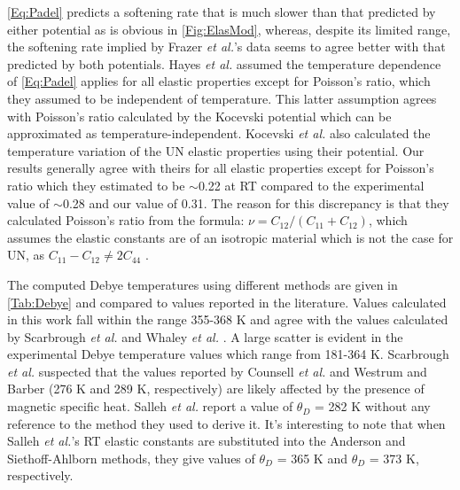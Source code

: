 \documentclass[preprint, 12pt]{elsarticle}
\begin{document}
\cref{Eq:Padel} predicts a softening rate that is much slower than that predicted by either potential as is obvious in \cref{Fig:ElasMod}, whereas, despite its limited range, the softening rate implied by Frazer \textit{et al.}'s data \cite{Frazer2021} seems to agree better with that predicted by both potentials. Hayes \textit{et al.} \cite{Hayes1990II} assumed the temperature dependence of \cref{Eq:Padel} applies for all elastic properties except for Poisson's ratio, which they assumed to be independent of temperature. This latter assumption agrees with Poisson's ratio calculated by the Kocevski potential which can be approximated as temperature-independent. Kocevski \textit{et al.} \cite{Kocevski2022II} also calculated the temperature variation of the UN elastic properties using their potential. Our results generally agree with theirs for all elastic properties except for Poisson's ratio which they estimated to be $\sim$0.22 at RT compared to the experimental value of $\sim$0.28 and our value of 0.31. The reason for this discrepancy is that they calculated Poisson's ratio from the formula: $\nu = C_{12}/\left( C_{11}+C_{12} \right)$, which assumes the elastic constants are of an isotropic material which is not the case for UN, as $C_{11}-C_{12} \neq 2C_{44}$ \cite{Salleh1986, Zener1947}.

The computed Debye temperatures using different methods are given in \cref{Tab:Debye} and compared to values reported in the literature. Values calculated in this work fall within the range 355-368 K and agree with the values calculated by Scarbrough \textit{et al.} \cite{Scarbrough1968} and Whaley \textit{et al.} \cite{Whaley1969}. A large scatter is evident in the experimental Debye temperature values which range from 181-364 K. Scarbrough \textit{et al.} \cite{Scarbrough1968} suspected that the values reported by Counsell \textit{et al.} \cite{Counsell1964} and Westrum and Barber \cite{Westrum1966} (276 K and 289 K, respectively) are likely affected by the presence of magnetic specific heat. Salleh \textit{et al.} \cite{Salleh1986} report a value of $\theta_D$ = 282 K without any reference to the method they used to derive it. It's interesting to note that when Salleh \textit{et al.}'s RT elastic constants are substituted into the Anderson and Siethoff-Ahlborn methods, they give values of $\theta_D$ = 365 K and $\theta_D$ = 373 K, respectively.
\end{document}
